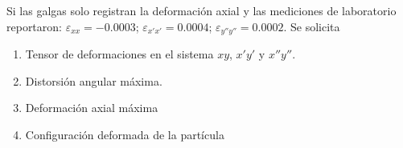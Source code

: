 \documentclass[../notas medios.tex]{subfiles}
\begin{document}
\begin{enumerate}
Si las galgas solo registran la deformación axial y las mediciones de laboratorio reportaron: $\varepsilon_{xx} = -0.0003$; $\varepsilon_{x'x'} = 0.0004$; $\varepsilon_{y''y''} = 0.0002$. Se solicita

\begin{enumerate}
\item Tensor de deformaciones en el sistema $xy$, $x'y'$ y $x''y''$. 

\item Distorsión angular máxima. 

\item Deformación axial máxima

\item Configuración deformada de la partícula
\end{enumerate}

\end{enumerate}
\end{document}
